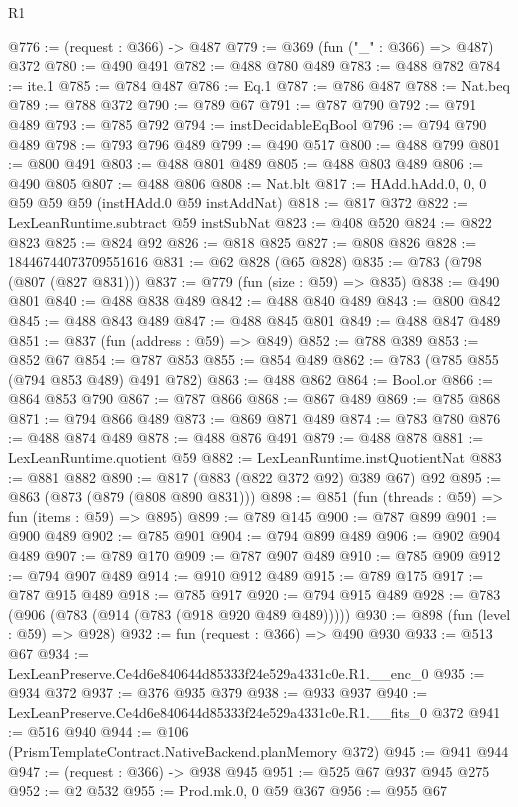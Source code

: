 \begin{lexlean}{R1}
\begin{coremodule}
@776 := (request : @366) -> @487
@779 := @369 (fun ("_" : @366) => @487) @372
@780 := @490 @491
@782 := @488 @780 @489
@783 := @488 @782
@784 := ite.{1}
@785 := @784 @487
@786 := Eq.{1}
@787 := @786 @487
@788 := Nat.beq
@789 := @788 @372
@790 := @789 @67
@791 := @787 @790
@792 := @791 @489
@793 := @785 @792
@794 := instDecidableEqBool
@796 := @794 @790 @489
@798 := @793 @796 @489
@799 := @490 @517
@800 := @488 @799
@801 := @800 @491
@803 := @488 @801 @489
@805 := @488 @803 @489
@806 := @490 @805
@807 := @488 @806
@808 := Nat.blt
@817 := HAdd.hAdd.{0, 0, 0} @59 @59 @59 (instHAdd.{0} @59 instAddNat)
@818 := @817 @372
@822 := LexLeanRuntime.subtract @59 instSubNat
@823 := @408 @520
@824 := @822 @823
@825 := @824 @92
@826 := @818 @825
@827 := @808 @826
@828 := 18446744073709551616
@831 := @62 @828 (@65 @828)
@835 := @783 (@798 (@807 (@827 @831)))
@837 := @779 (fun (size : @59) => @835)
@838 := @490 @801
@840 := @488 @838 @489
@842 := @488 @840 @489
@843 := @800 @842
@845 := @488 @843 @489
@847 := @488 @845 @801
@849 := @488 @847 @489
@851 := @837 (fun (address : @59) => @849)
@852 := @788 @389
@853 := @852 @67
@854 := @787 @853
@855 := @854 @489
@862 := @783 (@785 @855 (@794 @853 @489) @491 @782)
@863 := @488 @862
@864 := Bool.or
@866 := @864 @853 @790
@867 := @787 @866
@868 := @867 @489
@869 := @785 @868
@871 := @794 @866 @489
@873 := @869 @871 @489
@874 := @783 @780
@876 := @488 @874 @489
@878 := @488 @876 @491
@879 := @488 @878
@881 := LexLeanRuntime.quotient @59
@882 := LexLeanRuntime.instQuotientNat
@883 := @881 @882
@890 := @817 (@883 (@822 @372 @92) @389 @67) @92
@895 := @863 (@873 (@879 (@808 @890 @831)))
@898 := @851 (fun (threads : @59) => fun (items : @59) => @895)
@899 := @789 @145
@900 := @787 @899
@901 := @900 @489
@902 := @785 @901
@904 := @794 @899 @489
@906 := @902 @904 @489
@907 := @789 @170
@909 := @787 @907 @489
@910 := @785 @909
@912 := @794 @907 @489
@914 := @910 @912 @489
@915 := @789 @175
@917 := @787 @915 @489
@918 := @785 @917
@920 := @794 @915 @489
@928 := @783 (@906 (@783 (@914 (@783 (@918 @920 @489 @489)))))
@930 := @898 (fun (level : @59) => @928)
@932 := fun (request : @366) => @490 @930
@933 := @513 @67
@934 := LexLeanPreserve.Ce4d6e840644d85333f24e529a4331c0e.R1.__enc_0
@935 := @934 @372
@937 := @376 @935 @379
@938 := @933 @937
@940 := LexLeanPreserve.Ce4d6e840644d85333f24e529a4331c0e.R1.__fits_0 @372
@941 := @516 @940
@944 := @106 (PrismTemplateContract.NativeBackend.planMemory @372)
@945 := @941 @944
@947 := (request : @366) -> @938 @945
@951 := @525 @67 @937 @945 @275
@952 := @2 @532
@955 := Prod.mk.{0, 0} @59 @367
@956 := @955 @67

\end{coremodule}
\end{lexlean}
